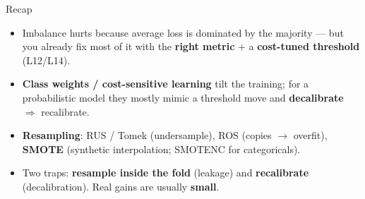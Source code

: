 \documentclass[aspectratio=169]{beamer}
\begin{document}
\begin{frame}{Recap}
  \begin{itemize}\small
    \item Imbalance hurts because average loss is dominated by the majority --- but you already
      fix most of it with the \textbf{right metric} + a \textbf{cost-tuned threshold} (L12/L14).
    \item \textbf{Class weights / cost-sensitive learning} tilt the training; for a probabilistic
      model they mostly mimic a threshold move and \textbf{decalibrate} $\Rightarrow$ recalibrate.
    \item \textbf{Resampling}: RUS / Tomek (undersample), ROS (copies $\to$ overfit),
      \textbf{SMOTE} (synthetic interpolation; SMOTENC for categoricals).
    \item Two traps: \textbf{resample inside the fold} (leakage) and \textbf{recalibrate}
      (decalibration). Real gains are usually \textbf{small}.
  \end{itemize}
  \vfill
\end{frame}
\end{document}
